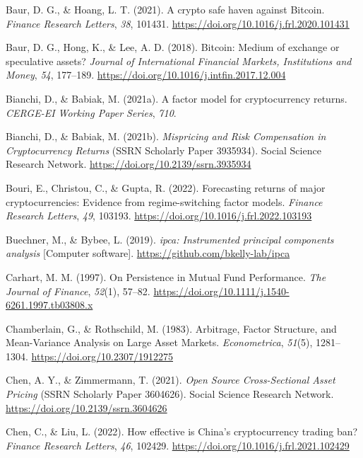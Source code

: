 \documentclass[
  12pt,
  a4paper,
  openany]{scrbook}
\newlength{\cslhangindent}
\newenvironment{CSLReferences}[2] %
 {\begin{list}{}{%
  \setlength{\itemindent}{0pt}
  \setlength{\leftmargin}{0pt}
  \setlength{\parsep}{0pt}
  \ifodd #1
   \setlength{\leftmargin}{\cslhangindent}
   \setlength{\itemindent}{-1\cslhangindent}
  \fi
  \setlength{\itemsep}{#2\baselineskip}}}
 {\end{list}}
\begin{document}
\begin{CSLReferences}{1}{0}
Baur, D. G., \& Hoang, L. T. (2021). A crypto safe haven against
Bitcoin. \emph{Finance Research Letters}, \emph{38}, 101431.
\url{https://doi.org/10.1016/j.frl.2020.101431}

Baur, D. G., Hong, K., \& Lee, A. D. (2018). Bitcoin: Medium of exchange
or speculative assets? \emph{Journal of International Financial Markets,
Institutions and Money}, \emph{54}, 177--189.
\url{https://doi.org/10.1016/j.intfin.2017.12.004}

Bianchi, D., \& Babiak, M. (2021a). A factor model for cryptocurrency
returns. \emph{CERGE-EI Working Paper Series}, \emph{710}.

Bianchi, D., \& Babiak, M. (2021b). \emph{Mispricing and Risk
Compensation in Cryptocurrency Returns} (SSRN Scholarly Paper 3935934).
Social Science Research Network.
\url{https://doi.org/10.2139/ssrn.3935934}

Bouri, E., Christou, C., \& Gupta, R. (2022). Forecasting returns of
major cryptocurrencies: Evidence from regime-switching factor models.
\emph{Finance Research Letters}, \emph{49}, 103193.
\url{https://doi.org/10.1016/j.frl.2022.103193}

Buechner, M., \& Bybee, L. (2019). \emph{{ipca}: Instrumented principal
components analysis} {[}Computer software{]}.
\url{https://github.com/bkelly-lab/ipca}

Carhart, M. M. (1997). On Persistence in Mutual Fund Performance.
\emph{The Journal of Finance}, \emph{52}(1), 57--82.
\url{https://doi.org/10.1111/j.1540-6261.1997.tb03808.x}

Chamberlain, G., \& Rothschild, M. (1983). Arbitrage, Factor Structure,
and Mean-Variance Analysis on Large Asset Markets. \emph{Econometrica},
\emph{51}(5), 1281--1304. \url{https://doi.org/10.2307/1912275}

Chen, A. Y., \& Zimmermann, T. (2021). \emph{Open Source Cross-Sectional
Asset Pricing} (SSRN Scholarly Paper 3604626). Social Science Research
Network. \url{https://doi.org/10.2139/ssrn.3604626}

Chen, C., \& Liu, L. (2022). How effective is China's cryptocurrency
trading ban? \emph{Finance Research Letters}, \emph{46}, 102429.
\url{https://doi.org/10.1016/j.frl.2021.102429}


\end{CSLReferences}
\end{document}
